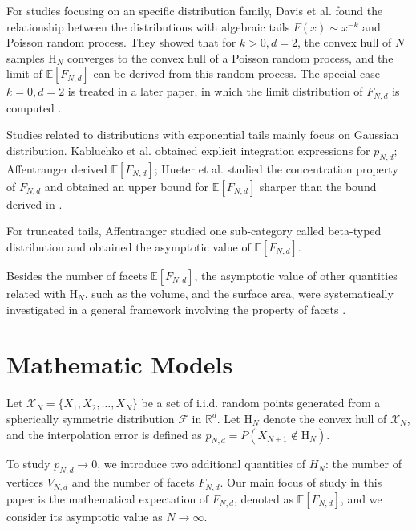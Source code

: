 \documentclass[conference,a4paper]{IEEEtran}
\def\E{\mathbb{E}}
\begin{document}
For studies focusing on an specific distribution family,
Davis et al. \cite{davis1987convex} found the relationship
between the distributions with algebraic tails $F(x) \sim x^{-k}$ and Poisson random process.
They showed that for $k>0, d=2$,
the convex hull of $N$ samples $\mathrm{H}_N$ converges to the convex hull of a Poisson random process,
and
the limit of $\E[F_{N,d}]$ can be derived from this random process.
The special case $k=0, d=2$ is treated in a later paper, in which the
limit distribution of $F_{N,d}$ is computed \cite{aldous1991number}.

Studies related to distributions with exponential tails mainly focus on Gaussian distribution.
Kabluchko et al. \cite{kabluchko2020absorption} obtained explicit integration expressions for $p_{N,d}$;
Affentranger \cite{affentranger1991convex} derived $\E[F_{N,d}]$;
Hueter et al. \cite{hueter1999limit} studied the concentration property of $F_{N,d}$ and obtained
an upper bound for $\E[F_{N,d}]$ sharper than the bound derived in \cite{dwyer1991convex}.

For truncated tails,
Affentranger \cite{affentranger1991convex} studied one sub-category called beta-typed distribution and obtained
the asymptotic value of $\E[F_{N,d}]$.

Besides the number of facets $\E[F_{N,d}]$,
the asymptotic value of other quantities related with $\mathrm{H}_N$, such as the volume, and the surface area,
were systematically investigated in a general framework involving the property of facets
\cite{schneider2008stochastic, barany2008random}.

\section{Mathematic Models}
\label{sec:int_f}

Let $\mathcal{X}_N = \{X_1, X_2, \dots, X_N\}$ be a set of i.i.d. random points generated from
a spherically symmetric distribution $\mathcal{F}$ in $\mathbb{R}^d$.
Let $\mathrm{H}_N$ denote the convex hull of $\mathcal{X}_N$,
and the interpolation error is defined as $p_{N,d}=P(X_{N+1} \not\in \mathrm{H}_N)$.

To study $p_{N,d} \to 0$, we introduce two additional quantities of $H_N$: the number of vertices
$V_{N,d}$ and the number of facets $F_{N,d}$.
Our main focus of study in this paper is the mathematical expectation
of $F_{N,d}$, denoted as $\E[F_{N,d}]$, and we consider its asymptotic value as $N\to \infty$.
\end{document}
